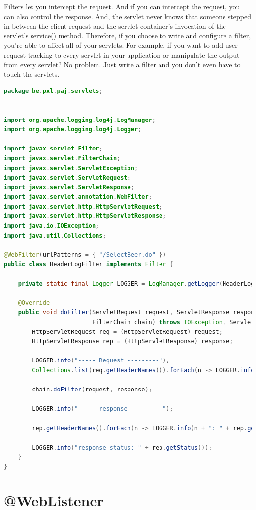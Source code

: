 Filters let you intercept the request.  And if you can intercept the request,
you can also control the response.  And, the servlet  never
knows that someone stepped in between the client request and the servlet container’s invocation 
of the servlet’s service() method.  Therefore,  if you choose to write and configure a filter, you're able to affect all of your servlets.  For example, if you want to add
user request tracking to every servlet in your application or manipulate the output
from every servlet? No problem.  Just write a filter and you don’t even have to touch the servlets.

\begin{lstlisting}[language=java, frame=single]
package be.pxl.paj.servlets;


import org.apache.logging.log4j.LogManager;
import org.apache.logging.log4j.Logger;

import javax.servlet.Filter;
import javax.servlet.FilterChain;
import javax.servlet.ServletException;
import javax.servlet.ServletRequest;
import javax.servlet.ServletResponse;
import javax.servlet.annotation.WebFilter;
import javax.servlet.http.HttpServletRequest;
import javax.servlet.http.HttpServletResponse;
import java.io.IOException;
import java.util.Collections;

@WebFilter(urlPatterns = { "/SelectBeer.do" })
public class HeaderLogFilter implements Filter {

	private static final Logger LOGGER = LogManager.getLogger(HeaderLogFilter.class);

	@Override
	public void doFilter(ServletRequest request, ServletResponse response,
	                     FilterChain chain) throws IOException, ServletException {
		HttpServletRequest req = (HttpServletRequest) request;
		HttpServletResponse rep = (HttpServletResponse) response;

		LOGGER.info("----- Request ---------");
		Collections.list(req.getHeaderNames()).forEach(n -> LOGGER.info(n + ": " + req.getHeader(n)));

		chain.doFilter(request, response);

		LOGGER.info("----- response ---------");

		rep.getHeaderNames().forEach(n -> LOGGER.info(n + ": " + rep.getHeader(n)));

		LOGGER.info("response status: " + rep.getStatus());
	}
}
\end{lstlisting}


\section{@WebListener}

